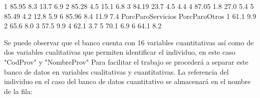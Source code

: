 \documentclass[11pt]{article}
\begin{document}
\begin{Schunk}
\begin{Soutput}
1              85.95                 8.3              13.7                  6.9
2              85.28                 4.5              15.1                  6.8
3              84.19                23.7               4.5                  4.4
4              87.05                 1.8              27.0                  5.4
5              85.49                 4.2              12.8                  5.9
6              85.96                 8.4              11.9                  7.4
  PorcParoServicios PorcParoOtros
1              61.1           9.9
2              65.6           8.0
3              57.5           9.9
4              62.1           3.7
5              70.1           6.9
6              64.1           8.2
\end{Soutput}
\end{Schunk}
Se puede observar que el banco cuenta con 16 variables cuantitativas así 
como de dos variables cualitativas que permiten identificar el individuo,
 en este caso "CodProv" y "NombreProv"
Para facilitar el trabajo se procederá a separar este banco de datos en variables cualitativas y cuantitativas. La referencia del individuo en el caso del banco de datos cuantitativo se almacenará en el nombre de la fila:
\end{document}
